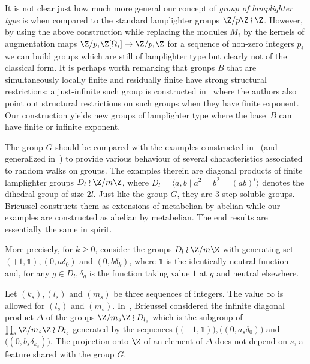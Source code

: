 \begin{rema}
It is not clear just how much more general our concept of \emph{group of lamplighter type} is when compared to the standard lamplighter groups $\Z/p\Z\wr\Z$. However, by using the above construction while replacing the modules $M_i$ by the kernels of augmentation maps $\Z/p_i\Z[\Omega_i]\to\Z/p_i\Z$ for a sequence of non-zero integers $p_i$ we can build groups which are still of lamplighter type but clearly not of the classical form. It is perhaps worth remarking that groups $B$ that are simultaneously locally finite and residually finite have strong structural restrictions: a just-infinite such group is constructed in~\cite{BGS} where the authors also point out structural restrictions on such groups when they have finite exponent. Our construction yields new groups of lamplighter type where the base~$B$ can have finite or infinite exponent.
\end{rema}


\begin{rema}
The group $G$ should be compared with the examples constructed in~\cite{Brieussel} (and generalized in~\cite{BZ}) to provide various behaviour of several characteristics associated to random walks on groups. The examples therein are diagonal products of finite lamplighter groups $D_l \wr\Z/m\Z$, where $D_l= \langle a, b \mid a^2=b^2=(ab)^l\rangle$ denotes the dihedral group of size $2l$. Just like the group $G$, they are $3$-step soluble groups. Brieussel constructs them as extensions of metabelian by abelian while our examples are constructed as abelian by metabelian. The end results are essentially the same in spirit.

More precisely, for $k \geq 0$, consider the groups $D_l \wr\Z/m\Z$ with generating set $(+1, \mathbb{1}), (0, a\delta_0)$ and $(0, b\delta_{k})$, where $\mathbb 1$ is the identically neutral function and, for any $g\in D_l, \delta_g$ is the function taking value $1$ at $g$ and neutral elsewhere.

Let $(k_s), (l_s)$ and $(m_s)$ be three sequences of integers. The value $\infty$ is allowed for $(l_s)$ and $(m_s)$. In~\cite{Brieussel}, Brieussel considered the infinite diagonal product $\Delta$ of the groups $\Z/m_s\Z \wr D_{l_s}$ which is the subgroup of $\prod_s \Z/m_s\Z \wr D_{l_s}$ generated by the sequences $\big((+1, \mathbb 1)\big), \big((0, a_s\delta_0)\big)$ and $ \big((0, b_s\delta_{k_s})\big)$. The projection onto $\Z$ of an element of $\Delta$ does not depend on $s$, a feature shared with the group $G$.
\end{rema}



